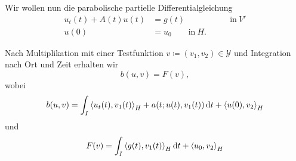 Wir wollen nun die parabolische partielle Differentialgleichung
\begin{equation}
    \label{eq:}
    \begin{aligned}
        u_t(t) + A(t) u(t) &= g(t) &\qquad \text{in}~V'\\
        u(0) &= u_0 \qquad \text{in}~H.
    \end{aligned}
\end{equation}

Nach Multiplikation mit einer Testfunktion $v \coloneqq (v_1, v_2) \in \mathcal{Y}$ und Integration nach Ort und Zeit erhalten wir
\begin{equation}
    \label{eq:bilinearform}
    b(u, v) = F(v),
\end{equation}
wobei
\begin{equation}
    b(u,v) = \int_{I} \left\langle u_{t}(t),v_{1}(t)\right\rangle_{H} + a(t; u(t), v_{1}(t)) \mathop{}\!\mathrm{d} t + \left\langle u(0),v_{2}\right\rangle_{H}
\end{equation}
und
\begin{equation}
    F(v) = \int_{I} \left\langle g(t),v_{1}(t)\right\rangle_{H} \mathop{}\!\mathrm{d} t + \left\langle u_{0},v_{2}\right\rangle_{H}
\end{equation}
